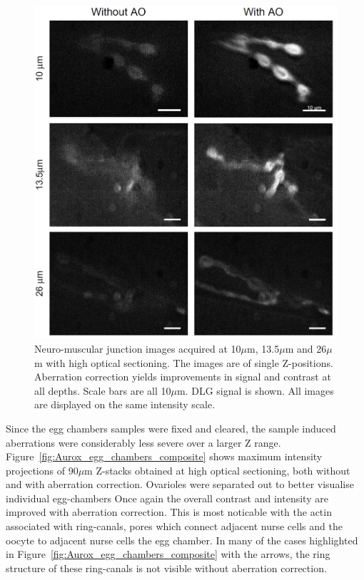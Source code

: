 \begin{figure}[h]
	\centering
	\includegraphics[width=\textwidth]{images/Aurox_depth_comparison_composite.jpg}
	\caption{Neuro-muscular junction images acquired at 10$\mu$m, 13.5$\mu$m 
		and 26$\mu$m with high optical sectioning. The images are of single 
		Z-positions. Aberration correction yields improvements in signal 
		and contrast at all depths. Scale bars are all 10$\mu$m. DLG signal 
		is shown. All images are displayed on the same intensity scale.}
	\label{fig:Aurox_depth_comparison_composite}
\end{figure}

Since the egg chambers samples were fixed and cleared, the sample induced 
aberrations were considerably less severe over a larger Z range. 
Figure~\ref{fig:Aurox_egg_chambers_composite} shows maximum intensity 
projections of 90$\mu$m Z-stacks obtained at high optical sectioning, both
without and with aberration correction. Ovarioles were separated out to 
better visualise individual egg-chambers Once again the overall contrast 
and intensity are improved with aberration correction. This is most 
noticable with the actin associated with ring-canals, pores which connect 
adjacent nurse cells and the oocyte to adjacent nurse cells the egg chamber.
In many of the cases highlighted in Figure~\ref{fig:Aurox_egg_chambers_composite}
with the arrows, the ring structure of these ring-canals is not visible
without aberration correction.

